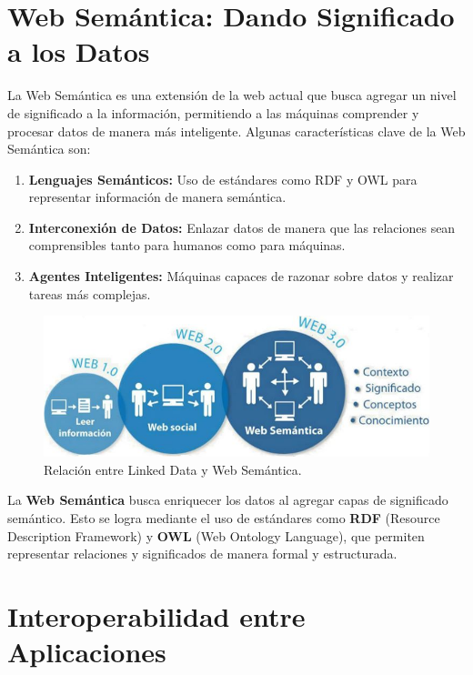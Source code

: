 \documentclass[11pt]{report}
\begin{document}
	\section{Web Semántica: Dando Significado a los Datos}
	
	La Web Semántica es una extensión de la web actual que busca agregar un nivel de significado a la información, permitiendo a las máquinas comprender y procesar datos de manera más inteligente. Algunas características clave de la Web Semántica son:
	
	\begin{enumerate}
		\item \textbf{Lenguajes Semánticos:} Uso de estándares como RDF y OWL para representar información de manera semántica.
	   
		\item \textbf{Interconexión de Datos:} Enlazar datos de manera que las relaciones sean comprensibles tanto para humanos como para máquinas.
		
		\item \textbf{Agentes Inteligentes:} Máquinas capaces de razonar sobre datos y realizar tareas más complejas.
	\end{enumerate}
		
	\begin{figure}[H]
		\centering
		\includegraphics[scale=0.4]{../img/websemantica.jpg}
		\caption{Relación entre Linked Data y Web Semántica.}
		\label{fig:websemantica}
	\end{figure}

	La \textbf{Web Semántica} busca enriquecer los datos al agregar capas de significado semántico. Esto se logra mediante el uso de estándares como \textbf{RDF} (Resource Description Framework) y \textbf{OWL} (Web Ontology Language), que permiten representar relaciones y significados de manera formal y estructurada.

	\section{Interoperabilidad entre Aplicaciones}
\end{document}
